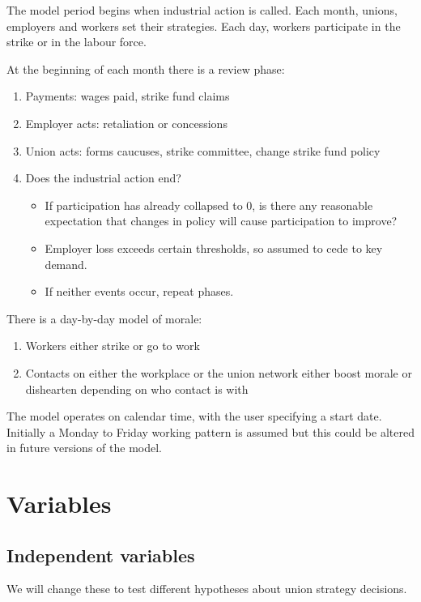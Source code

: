\documentclass[a4paper]{article}
\begin{document}
The model period begins when industrial action is called. Each month, unions, employers and workers set their strategies. Each day, workers participate in the strike or in the labour force.

At the beginning of each month there is a review phase:

\begin{enumerate}
    \item Payments: wages paid, strike fund claims
    \item Employer acts: retaliation or concessions
    \item Union acts: forms caucuses, strike committee, change strike fund policy
    \item Does the industrial action end?
    \begin{itemize}
        \item If participation has already collapsed to 0, is there any reasonable expectation that changes in policy will cause participation to improve?
        \item Employer loss exceeds certain thresholds, so assumed to cede to key demand.
        \item If neither events occur, repeat phases. 
    \end{itemize}
\end{enumerate}

There is a day-by-day model of morale:

\begin{enumerate}
    \item  Workers either strike or go to work
    \item  Contacts on either the workplace or the union network either boost morale or dishearten depending on who contact is with
\end{enumerate}

The model operates on calendar time, with the user specifying a start date. Initially a Monday to Friday working pattern is assumed but this could be altered in future versions of the model.

\section{Variables}

\subsection{Independent variables}

We will change these to test different hypotheses about union strategy decisions.
\end{document}
